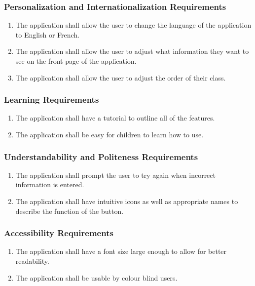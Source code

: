 \documentclass[]{article}
\begin{document}
\subsubsection{Personalization and Internationalization Requirements}
\label{ssub:personalization_and_internationalization_requirements}
\begin{enumerate}[{UH}1. ]
	\item The application shall allow the user to change the language of the
application to English or French.
	\item The application shall allow the user to adjust what information they want
to see on the front page of the application.
	\item The application shall allow the user to adjust the order of their class.
\end{enumerate}

\subsubsection{Learning Requirements}
\label{ssub:learning_requirements}
\begin{enumerate}[{UH}1. ]
	\item The application shall have a tutorial to outline all of the features.
	\item The application shall be easy for children to learn how to use.
\end{enumerate}

\subsubsection{Understandability and Politeness Requirements}
\label{ssub:understandability_and_politeness_requirements}
\begin{enumerate}[{UH}1. ]
	\item The application shall prompt the user to try again when incorrect
information is entered.
	\item The application shall have intuitive icons as well as appropriate names
to describe the function of the button.
\end{enumerate}

\subsubsection{Accessibility Requirements}
\label{ssub:accessibility_requirements}
\begin{enumerate}[{UH}1. ]
	\item The application shall have a font size large enough to allow for better
readability.
	\item The application shall be usable by colour blind users.
\end{enumerate}
\end{document}
